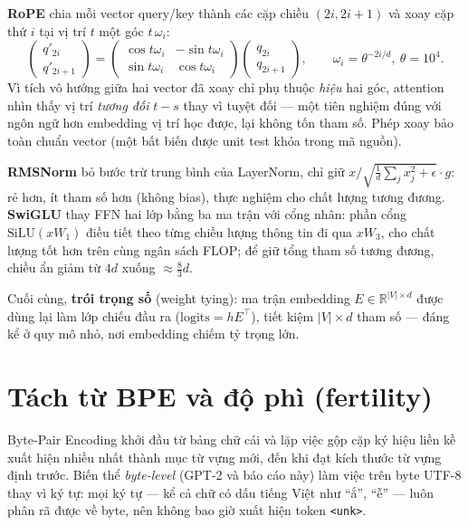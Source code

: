 \textbf{RoPE} \autocite{su2024rope} chia mỗi vector query/key thành các cặp
chiều $(2i, 2i{+}1)$ và xoay cặp thứ $i$ tại vị trí $t$ một góc
$t\,\omega_i$:
\begin{equation}
	\begin{pmatrix} q'_{2i} \\ q'_{2i+1} \end{pmatrix}
	= \begin{pmatrix} \cos t\omega_i & -\sin t\omega_i \\ \sin t\omega_i & \cos t\omega_i \end{pmatrix}
	  \begin{pmatrix} q_{2i} \\ q_{2i+1} \end{pmatrix},
	\qquad \omega_i = \theta^{-2i/d},\ \theta = 10^4.
	\label{eq:rope}
\end{equation}
Vì tích vô hướng giữa hai vector đã xoay chỉ phụ thuộc \emph{hiệu} hai góc,
attention nhìn thấy vị trí \emph{tương đối} $t - s$ thay vì tuyệt đối --- một
tiên nghiệm đúng với ngôn ngữ hơn embedding vị trí học được, lại không tốn
tham số. Phép xoay bảo toàn chuẩn vector (một bất biến được unit test khóa
trong mã nguồn).

\textbf{RMSNorm} \autocite{zhang2019rmsnorm} bỏ bước trừ trung bình của
LayerNorm, chỉ giữ $x / \sqrt{\tfrac{1}{d}\sum_j x_j^2 + \epsilon} \cdot g$:
rẻ hơn, ít tham số hơn (không bias), thực nghiệm cho chất lượng tương đương.
\textbf{SwiGLU} \autocite{shazeer2020glu} thay FFN hai lớp bằng ba ma trận với
cổng nhân: phần cổng $\mathrm{SiLU}(xW_1)$ điều tiết theo từng chiều lượng
thông tin đi qua $xW_3$, cho chất lượng tốt hơn trên cùng ngân sách FLOP; để
giữ tổng tham số tương đương, chiều ẩn giảm từ $4d$ xuống $\approx \tfrac{8}{3}d$.

Cuối cùng, \textbf{trói trọng số} (weight tying): ma trận embedding
$E \in \mathbb{R}^{|V| \times d}$ được dùng lại làm lớp chiếu đầu ra
($\mathrm{logits} = hE^\top$), tiết kiệm $|V| \times d$ tham số --- đáng kể ở
quy mô nhỏ, nơi embedding chiếm tỷ trọng lớn.

\section{Tách từ BPE và độ phì (fertility)}
\label{sec:bg-bpe}

Byte-Pair Encoding \autocite{sennrich2016bpe} khởi đầu từ bảng chữ cái và lặp
việc gộp cặp ký hiệu liền kề xuất hiện nhiều nhất thành mục từ vựng mới, đến
khi đạt kích thước từ vựng định trước. Biến thể \emph{byte-level} (GPT-2 và
báo cáo này) làm việc trên byte UTF-8 thay vì ký tự: mọi ký tự --- kể cả chữ
có dấu tiếng Việt như ``ắ'', ``ễ'' --- luôn phân rã được về byte, nên không
bao giờ xuất hiện token \texttt{<unk>}.

